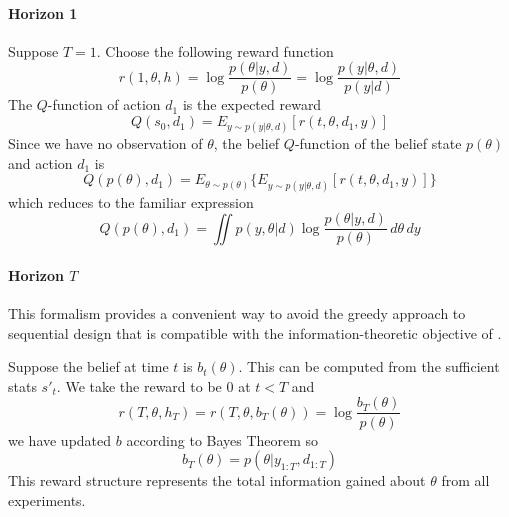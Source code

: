 \paragraph{Horizon 1}
Suppose $T=1$. Choose the following reward function
\begin{equation}
r(1, \theta, h) = \log \frac{p(\theta | y, d)}{p(\theta)} = \log \frac{p(y | \theta, d)}{p(y|d)}
\end{equation}
The $Q$-function of action $d_1$ is the expected reward
\begin{equation}
	Q(s_0, d_1) = E_{y \sim p(y|\theta, d)}[r(t, \theta, d_1, y)]
\end{equation}
Since we have no observation of $\theta$, the belief $Q$-function of the belief state $p(\theta)$ and action $d_1$ is
\begin{equation}
	Q(p(\theta), d_1) = E_{\theta \sim p(\theta)}\{E_{y \sim p(y|\theta, d)}[r(t, \theta, d_1, y)]\}
\end{equation}
which reduces to the familiar expression
\begin{equation}
	Q(p(\theta), d_1) = \iint p(y, \theta | d) \log \frac{p(\theta | y, d)}{p(\theta)} \, d\theta \, dy
\end{equation}

\paragraph{Horizon $T$}
This formalism provides a convenient way to avoid the greedy approach to sequential design that is compatible with the information-theoretic objective of \cite{lindley1956}.

Suppose the belief at time $t$ is $b_t(\theta)$. This can be computed from the sufficient stats $s'_t$. We take the reward to be $0$ at $t<T$ and
\begin{equation}
	r(T, \theta, h_T) = r(T, \theta, b_T(\theta)) = \log \frac{b_T(\theta) }{p(\theta)}
\end{equation}
we have updated $b$ according to Bayes Theorem so
\begin{equation}
	b_T(\theta) = p(\theta | y_{1:T}, d_{1:T})
\end{equation}
This reward structure represents the total information gained about $\theta$ from all experiments.

